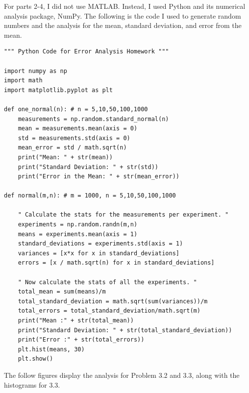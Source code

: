 \documentclass[12pt]{article}
\begin{document}
For parts 2-4, I did not use MATLAB. Instead, I used Python and its numerical analysis package, NumPy. The following is the code I used to generate random numbers and the analysis for the mean, standard deviation, and error from the mean. 
\begin{lstlisting}
""" Python Code for Error Analysis Homework """

import numpy as np 
import math 
import matplotlib.pyplot as plt

def one_normal(n): # n = 5,10,50,100,1000
	measurements = np.random.standard_normal(n)
	mean = measurements.mean(axis = 0)
	std = measurements.std(axis = 0)
	mean_error = std / math.sqrt(n)
	print("Mean: " + str(mean))
	print("Standard Deviation: " + str(std))
	print("Error in the Mean: " + str(mean_error))

def normal(m,n): # m = 1000, n = 5,10,50,100,1000

	" Calculate the stats for the measurements per experiment. "
	experiments = np.random.randn(m,n)
	means = experiments.mean(axis = 1)
	standard_deviations = experiments.std(axis = 1)
	variances = [x*x for x in standard_deviations]
	errors = [x / math.sqrt(n) for x in standard_deviations]

	" Now calculate the stats of all the experiments. " 
	total_mean = sum(means)/m
	total_standard_deviation = math.sqrt(sum(variances))/m
	total_errors = total_standard_deviation/math.sqrt(m)
	print("Mean :" + str(total_mean))
	print("Standard Deviation: " + str(total_standard_deviation))
	print("Error :" + str(total_errors))
	plt.hist(means, 30)
	plt.show()
\end{lstlisting}

The follow figures display the analysis for Problem 3.2 and 3.3, along with the histograms for 3.3. 
\end{document}
